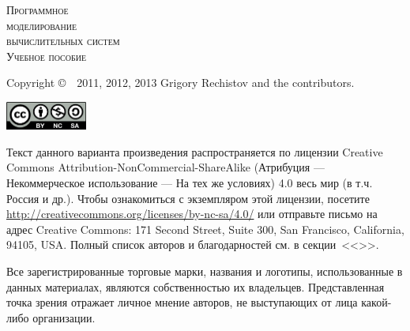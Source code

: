 
\newlength{\centeroffset}
\setlength{\centeroffset}{-0.5\oddsidemargin}
\addtolength{\centeroffset}{0.5\evensidemargin}

\thispagestyle{empty}

\begin{center}
    {\Huge\textsc{Программное \\ моделирование \\ \vspace{3pt} вычислительных систем}}
    \vspace{1cm}\\
    {\Large\textsc{Учебное пособие}}
\end{center}

\noindent\hspace*{\centeroffset}
\pagebreak

\thispagestyle{empty}
\begin{small} 
Copyright \copyright~~2011, 2012, 2013 Grigory Rechistov and the contributors. %
\begin{center}
    \includegraphics[width=0.2\textwidth]{../cc-by-nc-sa.png}
\end{center}

Текст данного варианта произведения распространяется по лицензии Creative Commons At\-tri\-bu\-tion-Non\-Com\-mer\-cial-Share\-Alike (Атрибуция — Некоммерческое использование — На тех же условиях) 4.0 весь мир (в т.ч. Россия и др.). Чтобы ознакомиться с экземпляром этой лицензии, посетите \url{http://creativecommons.org/licenses/by-nc-sa/4.0/} или отправьте письмо на адрес Creative Commons: 171 Second Street, Suite 300, San Francisco, California, 94105, USA. 
Полный список авторов и благодарностей см. в секции~<<>>.

Все зарегистрированные торговые марки, названия и логотипы, использованные в данных материалах, являются собственностью их владельцев. Представленная точка зрения отражает личное мнение авторов, не выступающих от лица какой-либо организации.
\end{small}

